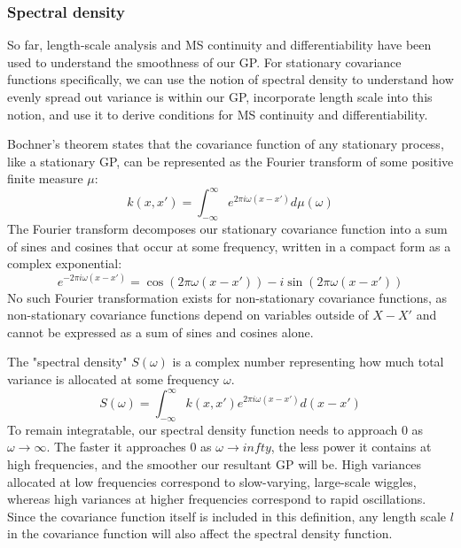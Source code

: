 \subsubsection{Spectral density}
So far, length-scale analysis and MS continuity and differentiability have been used to understand the smoothness of our GP. For stationary covariance functions specifically, we can use the notion of spectral density to understand how evenly spread out variance is within our GP, incorporate length scale into this notion, and use it to derive conditions for MS continuity and differentiability.

Bochner's theorem \cite{bochner} states that the covariance function of any stationary process, like a stationary GP, can be represented as the Fourier transform of some positive finite measure $\mu$:
\begin{equation} \label{eq:bochner}
    k(x, x') = \int_{-\infty}^{\infty} e^{2\pi i \omega (x - x')} d\mu(\omega)
\end{equation}
The Fourier transform decomposes our stationary covariance function into a sum of sines and cosines that occur at some frequency, written in a compact form as a complex exponential:
\begin{equation*}
    e^{-2\pi i \omega (x - x')} = \cos(2\pi \omega (x - x')) - i \sin(2\pi \omega (x - x'))
\end{equation*}
No such Fourier transformation exists for non-stationary covariance functions, as non-stationary covariance functions depend on variables outside of $X - X'$ and cannot be expressed as a sum of sines and cosines alone.

The "spectral density" $S(\omega)$ is a complex number representing how much total variance is allocated at some frequency $\omega$. 
\begin{equation} \label{eq:spectral-density}
    S(\omega) = \int_{-\infty}^{\infty} k(x, x') e^{2\pi i \omega (x - x')} d(x - x')
\end{equation}
To remain integratable, our spectral density function needs to approach $0$ as $\omega \to \infty$. The faster it approaches $0$ as $\omega \to infty$, the less power it contains at high frequencies, and the smoother our resultant GP will be. High variances allocated at low frequencies correspond to slow-varying, large-scale wiggles, whereas high variances at higher frequencies correspond to rapid oscillations. Since the covariance function itself is included in this definition, any length scale $l$ in the covariance function will also affect the spectral density function.

